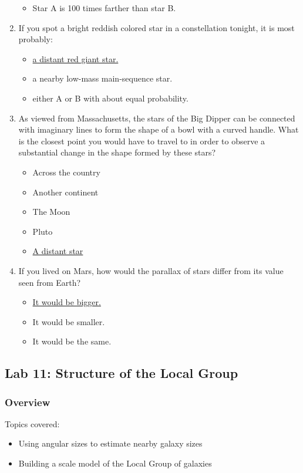 \documentclass[12pt]{article}
\begin{document}
\begin{enumerate}
\begin{itemize}
    \item Star A is 100 times farther than star B.
\end{itemize}
\item
If you spot a bright reddish colored star in a constellation tonight, it is most probably:
\begin{itemize}
    \item \underline{a distant red giant star.}
    \item a nearby low-mass main-sequence star.
    \item either A or B with about equal probability.
\end{itemize}
\item
As viewed from Massachusetts, the stars of the Big Dipper can be connected with imaginary lines to form the shape of a bowl with a curved handle. What is the closest point you would have to travel to in order to observe a substantial change in the shape formed by these stars?
\begin{itemize}
    \item Across the country
    \item Another continent
    \item The Moon
    \item Pluto
    \item \underline{A distant star}
\end{itemize}
\item
If you lived on Mars, how would the parallax of stars differ from its value seen from Earth?
\begin{itemize}
    \item \underline{It would be bigger.}
    \item It would be smaller.
    \item It would be the same.
\end{itemize}
\end{enumerate}


\newpage
\subsection{Lab 11: Structure of the Local Group}

\subsubsection{Overview}

Topics covered:
\begin{itemize}
\item Using angular sizes to estimate nearby galaxy sizes
\item Building a scale model of the Local Group of galaxies
\end{itemize}
\end{document}
